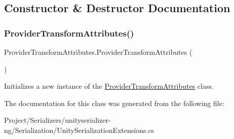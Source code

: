 \subsection{Constructor \& Destructor Documentation}
\mbox{\label{class_provider_transform_attributes_abe82df40bd69bae09ae373516d1e2bf1}} 
\subsubsection{\texorpdfstring{Provider\+Transform\+Attributes()}{ProviderTransformAttributes()}}
{\footnotesize\ttfamily Provider\+Transform\+Attributes.\+Provider\+Transform\+Attributes (\begin{DoxyParamCaption}{ }\end{DoxyParamCaption})\hspace{0.3cm}{\ttfamily [inline]}}



Initializes a new instance of the \hyperlink{class_provider_transform_attributes}{Provider\+Transform\+Attributes} class. 



The documentation for this class was generated from the following file\+:\begin{DoxyCompactItemize}
\item 
Project/\+Serializers/unityserializer-\/ng/\+Serialization/Unity\+Serialization\+Extensions.\+cs\end{DoxyCompactItemize}

